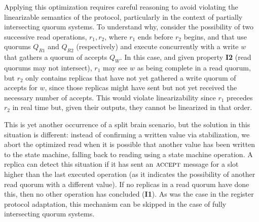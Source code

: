 Applying this optimization requires careful reasoning to avoid
violating the linearizable semantics of the protocol,
particularly in the context of partially intersecting quorum
systems. To understand why, consider the possibility of two
successive read operations, $r_1, r_2$, where $r_1$ ends before
$r_2$ begins, and that use quorums $Q_{R1}$ and $Q_{R2}$
(respectively) and execute concurrently with a write $w$ that
gathers a quorum of accepts $Q_W$. In this case, and given
property \textbf{I2} (read quorums may not intersect), $r_1$ may
see $w$ as being complete in a read quorum, but $r_2$ only
contains replicas that have not yet gathered a write quorum of
accepts for $w$, since those replicas might have sent but not yet
received the necessary number of accepts. This would violate
linearizability since $r_1$ precedes $r_2$ in real time but,
given their outputs, they cannot be linearized in that order.

This is yet another occurrence of a split brain scenario, but
the solution in this situation is different: instead of
confirming a written value via stabilization, we abort the
optimized read when it is possible that another value has been
written to the state machine, falling back to reading using a
state machine operation. A replica can detect this situation if
it has sent an $\textsc{accept}$ message for a slot
higher than the last executed operation (as it indicates the
possibility of another read quorum with a different value). If no
replicas in a read quorum have done this, then no other operation
has concluded (\textbf{I1}). As was the case in the register
protocol adaptation, this mechanism can be skipped in the case of
fully intersecting quorum systems.

